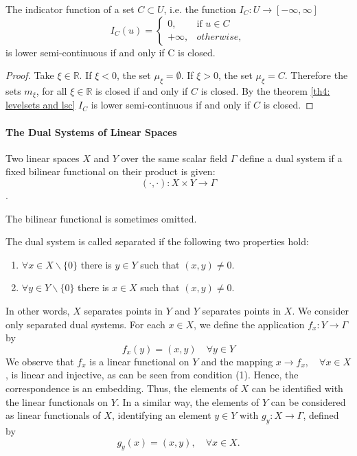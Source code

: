 \begin{example}
The indicator function of a set $C \subset U$, i.e. the function $I_C: U\rightarrow[-\infty, \infty]$
\begin{equation*}
I_C(u)=
\left\lbrace
	\begin{array}{rl}
	0, & \text{if } u \in C \\
	+\infty, & otherwise,
	\end{array}
\right.
\end{equation*}
is lower semi-continuous if and only if C is closed. 
\begin{proof}
	Take $\xi \in \mathbb{R}$.  If $\xi < 0$, the set $\mu_\xi=\emptyset$. If $\xi >0$, the set $\mu_\xi = C$. Therefore the sets $m_\xi$, for all $\xi \in \mathbb{R}$ is closed if and only if $C$ is closed. By the theorem \ref{th4: levelsets and lsc} $I_C$ is lower semi-continuous if and only if $C$ is closed.
\end{proof}
\end{example}


\paragraph{The Dual Systems of Linear Spaces} 
Two linear spaces $X$ and $Y$ over the same scalar field $\Gamma$ define a dual system if a
fixed bilinear functional on their product is given:
\[(\cdot, \cdot) : X \times Y \rightarrow \Gamma\].

The bilinear functional is sometimes omitted. 

The dual system is called separated if the following two properties hold:
\begin{enumerate}
	\item $\forall x \in X \backslash \{0\}$ there is $y \in Y$ such that $(x, y) \neq 0$.
	\item $\forall y \in Y \backslash \{0\}$ there is $x \in X$ such that $(x, y) \neq 0$. 
\end{enumerate}


In other words, $X$ separates points in $Y$ and $Y$ separates points in $X$.
We consider only separated dual systems.
For each $x \in X$, we define the application $f_x: Y \rightarrow \Gamma$ by
\[f_x(y) = (x, y) \quad \forall y \in Y\]
We observe that $f_x$ is a linear functional on $Y$ and the mapping
$x \rightarrow f_x, \quad \forall x \in X$,
is linear and injective, as can be seen from condition (1). Hence, the correspondence is an embedding. Thus, the elements of $X$ can be identified with the linear
functionals on $Y$. In a similar way, the elements of $Y$ can be considered as linear functionals of $X$, identifying an element $y \in Y$ with $g_y: X\rightarrow \Gamma$, defined by
\[g_y(x) = (x, y), \quad \forall x \in X.\]

